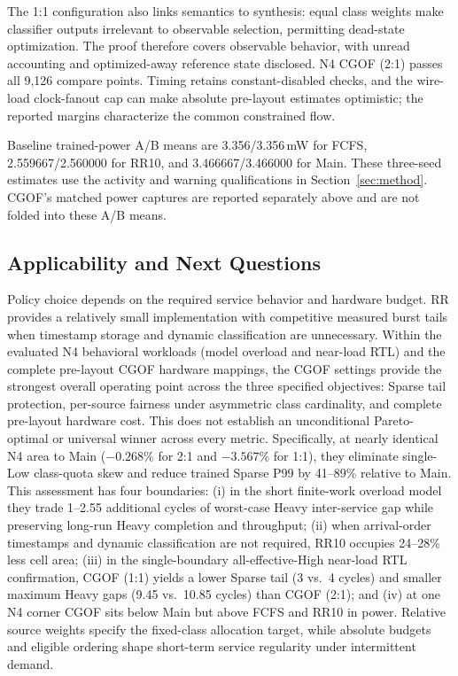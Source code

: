 The 1:1 configuration also links semantics to synthesis: equal class weights make classifier outputs irrelevant to observable selection, permitting dead-state optimization. The proof therefore covers observable behavior, with unread accounting and optimized-away reference state disclosed. N4 CGOF (2:1) passes all 9,126 compare points. Timing retains constant-disabled checks, and the wire-load clock-fanout cap can make absolute pre-layout estimates optimistic; the reported margins characterize the common constrained flow.

Baseline trained-power A/B means are 3.356/3.356\,mW for FCFS, 2.559667/2.560000 for RR10, and 3.466667/3.466000 for Main. These three-seed estimates use the activity and warning qualifications in Section~\ref{sec:method}. CGOF's matched power captures are reported separately above and are not folded into these A/B means.

\balance
\subsection{Applicability and Next Questions}
Policy choice depends on the required service behavior and hardware budget. RR provides a relatively small implementation with competitive measured burst tails when timestamp storage and dynamic classification are unnecessary. Within the evaluated N4 behavioral workloads (model overload and near-load RTL) and the complete pre-layout CGOF hardware mappings, the CGOF settings provide the strongest overall operating point across the three specified objectives: Sparse tail protection, per-source fairness under asymmetric class cardinality, and complete pre-layout hardware cost. This does not establish an unconditional Pareto-optimal or universal winner across every metric. Specifically, at nearly identical N4 area to Main ($-0.268\%$ for 2:1 and $-3.567\%$ for 1:1), they eliminate single-Low class-quota skew and reduce trained Sparse P99 by 41--89\% relative to Main. This assessment has four boundaries: (i) in the short finite-work overload model they trade 1--2.55 additional cycles of worst-case Heavy inter-service gap while preserving long-run Heavy completion and throughput; (ii) when arrival-order timestamps and dynamic classification are not required, RR10 occupies 24--28\% less cell area; (iii) in the single-boundary all-effective-High near-load RTL confirmation, CGOF (1:1) yields a lower Sparse tail (3 vs.\ 4 cycles) and smaller maximum Heavy gaps (9.45 vs.\ 10.85 cycles) than CGOF (2:1); and (iv) at one N4 corner CGOF sits below Main but above FCFS and RR10 in power. Relative source weights specify the fixed-class allocation target, while absolute budgets and eligible ordering shape short-term service regularity under intermittent demand.

